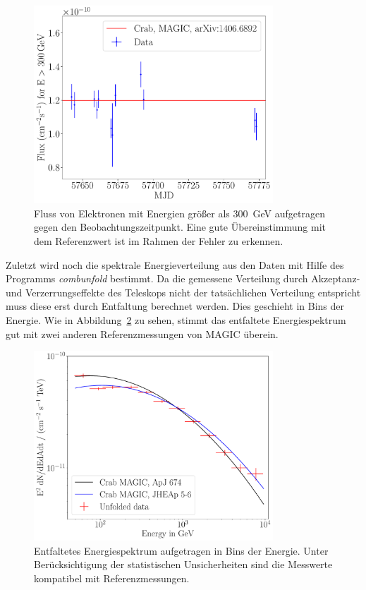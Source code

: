 \begin{figure}
  \centering
  \includegraphics[width=0.8\textwidth]{figures/flute_lichtkurve.pdf}
  \caption{Fluss von Elektronen mit Energien größer als
  \SI{300}{\giga\electronvolt} aufgetragen gegen den Beobachtungszeitpunkt. Eine
  gute Übereinstimmung mit dem Referenzwert ist im Rahmen der Fehler zu
  erkennen.}
  \label{fig:lichtkurve}
\end{figure}

Zuletzt wird noch die spektrale Energieverteilung aus den Daten mit Hilfe des
Programms \textit{combunfold} bestimmt. Da die gemessene Verteilung durch
Akzeptanz- und Verzerrungseffekte des Teleskops nicht der tatsächlichen
Verteilung entspricht muss diese erst durch Entfaltung berechnet werden. Dies
geschieht in Bins der Energie. Wie in Abbildung~\ref{fig:entfaltung} zu sehen,
stimmt das entfaltete Energiespektrum gut mit zwei anderen Referenzmessungen von
MAGIC überein.

\begin{figure}
  \centering
  \includegraphics[width=0.8\textwidth]{figures/combunfold_energyspectrum.pdf}
  \caption{Entfaltetes Energiespektrum aufgetragen in Bins der Energie. Unter
  Berücksichtigung der statistischen Unsicherheiten sind die Messwerte
  kompatibel mit Referenzmessungen.}
  \label{fig:entfaltung}
\end{figure}
